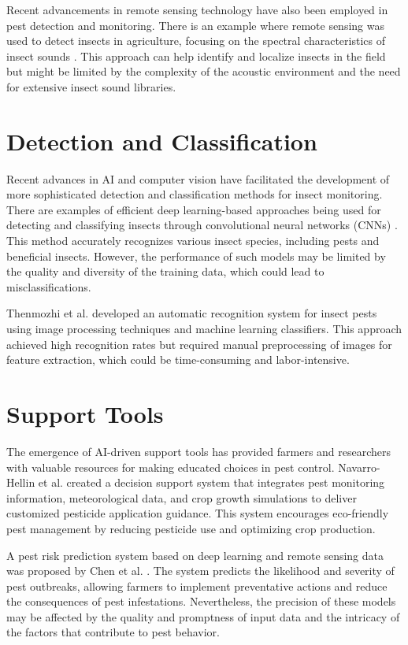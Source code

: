 Recent advancements in remote sensing technology have also been employed in pest detection and monitoring. There is an example where remote sensing was used to detect insects in agriculture, focusing on the spectral characteristics of insect sounds \cite{mankin_mccoy_flanders_brandhorst_crocker_shapiro}. This approach can help identify and localize insects in the field but might be limited by the complexity of the acoustic environment and the need for extensive insect sound libraries.

\section{Detection and Classification}
Recent advances in AI and computer vision have facilitated the development of more sophisticated detection and classification methods for insect monitoring. There are examples of efficient deep learning-based approaches being used for detecting and classifying insects through convolutional neural networks (CNNs) \cite{insects14020148}. This method accurately recognizes various insect species, including pests and beneficial insects. However, the performance of such models may be limited by the quality and diversity of the training data, which could lead to misclassifications.

Thenmozhi et al. \cite{THENMOZHI2019104906} developed an automatic recognition system for insect pests using image processing techniques and machine learning classifiers. This approach achieved high recognition rates but required manual preprocessing of images for feature extraction, which could be time-consuming and labor-intensive.

\section{Support Tools}
The emergence of AI-driven support tools has provided farmers and researchers with valuable resources for making educated choices in pest control. Navarro-Hellin et al. \cite{NAVARROHELLIN2016121} created a decision support system that integrates pest monitoring information, meteorological data, and crop growth simulations to deliver customized pesticide application guidance. This system encourages eco-friendly pest management by reducing pesticide use and optimizing crop production.

A pest risk prediction system based on deep learning and remote sensing data was proposed by Chen et al. \cite{CHEN2022107302}. The system predicts the likelihood and severity of pest outbreaks, allowing farmers to implement preventative actions and reduce the consequences of pest infestations. Nevertheless, the precision of these models may be affected by the quality and promptness of input data and the intricacy of the factors that contribute to pest behavior.


